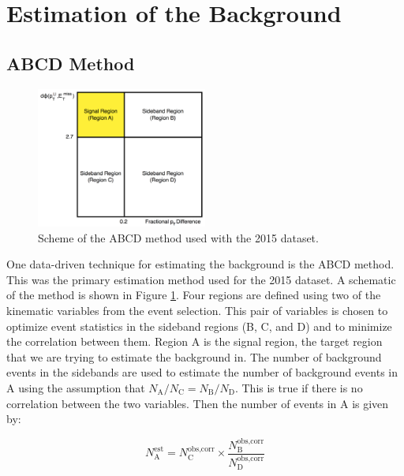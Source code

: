 \section{Estimation of the \Zjets Background}
\label{sec:zjets}

\subsection{ABCD Method}

\begin{figure}[htb]
\centering
\includegraphics[width=0.5\textwidth]{Figures/abcd2.png}
\caption{Scheme of the ABCD method used with the 2015 dataset.}
\label{fig:abcd}
\end{figure}

One data-driven technique for estimating the \Zjets background is the ABCD method. This was the primary estimation method used for the 2015 dataset. A schematic of the method is shown in Figure \ref{fig:abcd}. Four regions are defined using two of the kinematic variables from the event selection. This pair of variables is chosen to optimize event statistics in the sideband regions (B, C, and D) and to minimize the correlation between them. Region A is the signal region, the target region that we are trying to estimate the background in. The number of background events in the sidebands are used to estimate the number of background events in A using the assumption that $N_\text{A}/N_\text{C} = N_\text{B}/N_\text{D}$. This is true if there is no correlation between the two variables. Then the number of \Zjets events in A is given by:

\begin{equation}
N_\text{A}^\text{est} = N_\text{C}^\text{obs,corr} \times \frac{N_\text{B}^\text{obs,corr}}{N_\text{D}^\text{obs,corr}}
\end{equation}

